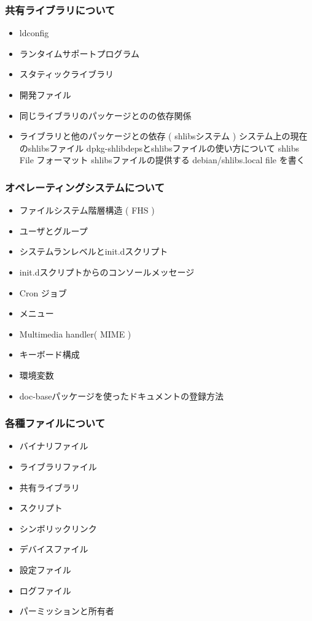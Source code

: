 \documentclass[mingoth,a4paper]{jsarticle}
\begin{document}
    \subsubsection{共有ライブラリについて}
\begin{itemize}
        \item ldconfig
        \item ランタイムサポートプログラム
        \item スタティックライブラリ
        \item 開発ファイル
        \item 同じライブラリのパッケージとのの依存関係
        \item ライブラリと他のパッケージとの依存 ( shlibsシステム )
            システム上の現在のshlibsファイル
            dpkg-shlibdepsとshlibsファイルの使い方について
            shlibs File フォーマット
            shlibsファイルの提供する
            debian/shlibs.local file を書く
\end{itemize}
    \subsubsection{オペレーティングシステムについて}
\begin{itemize}
        \item ファイルシステム階層構造 ( FHS )
        \item ユーザとグループ
        \item システムランレベルとinit.dスクリプト
        \item init.dスクリプトからのコンソールメッセージ
        \item Cron ジョブ
        \item メニュー
        \item Multimedia handler( MIME )
        \item キーボード構成
        \item 環境変数
        \item doc-baseパッケージを使ったドキュメントの登録方法
\end{itemize}
    \subsubsection{各種ファイルについて}
\begin{itemize}
        \item バイナリファイル
        \item ライブラリファイル
        \item 共有ライブラリ
        \item スクリプト
        \item シンボリックリンク
        \item デバイスファイル
        \item 設定ファイル
        \item ログファイル
        \item パーミッションと所有者
\end{itemize}
\end{document}
